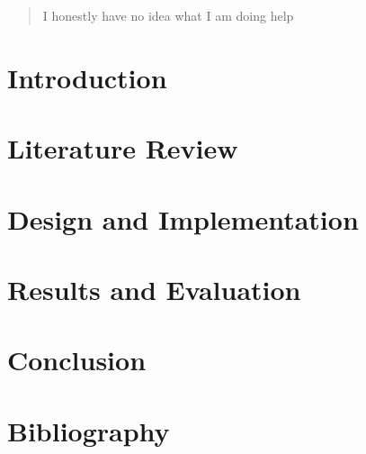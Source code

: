 \documentclass[11pt, a4paper, notitlepage]{report}
\begin{document}
\begin{titlepage}
		
		
		\begin{abstract}
			\normalsize
			I honestly have no idea what I am doing help
		\end{abstract}
		
		\vfill %
		
	\end{titlepage}

\newpage
\tableofcontents
\newpage
	
	\chapter{Introduction}
	
	\chapter{Literature Review}
	
	\chapter{Design and Implementation}
	
	\chapter{Results and Evaluation}
	
	\chapter{Conclusion}
	
	\chapter{Bibliography}
	
	\appendix
	
	
\end{document}
